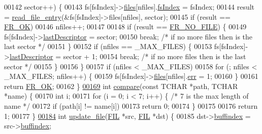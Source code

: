 \begin{DoxyCode}
00142       sector++) \{
00143     fs[fsIndex]->\hyperlink{structFS_a5772298ea6aafc77f842037933531a02}{files}[nfiles].\hyperlink{structFIL_ab32bf8d0b478b2cef4942b2128f4f5f5}{fsIndex} = fsIndex;
00144     result = \hyperlink{fileSystem_8c_a4ab6badca8cdbe971b432c8a3bb7b0b1}{read\_file\_entry}(&fs[fsIndex]->files[nfiles], sector);
00145     \textcolor{keywordflow}{if} (result == \hyperlink{fileSystem_8h_a49d0171ecbd362cda5680a0d360db44ca62fce5cd9df008f8fc85f99706bda5f1}{FR\_OK})
00146       nfiles++;
00147 
00148     \textcolor{keywordflow}{if} (result == \hyperlink{fileSystem_8h_a49d0171ecbd362cda5680a0d360db44ca97da8f98fc2e66d8fa7847f9ebb19b8c}{FR\_NO\_FILE}) \{
00149       fs[fsIndex]->\hyperlink{structFS_a050f921ab2140aa4eadce4a140b61fbe}{lastDescriptor} = sector;
00150       \textcolor{keywordflow}{break}; \textcolor{comment}{/* if no more files then is the last sector */}
00151     \}
00152     \textcolor{keywordflow}{if} (nfiles == \_MAX\_FILES) \{
00153       fs[fsIndex]->\hyperlink{structFS_a050f921ab2140aa4eadce4a140b61fbe}{lastDescriptor} = sector + 1;
00154       \textcolor{keywordflow}{break}; \textcolor{comment}{/* if no more files then is the last sector */}
00155     \}
00156   \}
00157   \textcolor{keywordflow}{if} (nfiles < \_MAX\_FILES)
00158     \textcolor{keywordflow}{for} (; nfiles < \_MAX\_FILES; nfiles++) \{
00159       fs[fsIndex]->\hyperlink{structFS_a5772298ea6aafc77f842037933531a02}{files}[nfiles].\hyperlink{structFIL_aea440945db26de9c4a88065c0c887fda}{err} = 1;
00160     \}
00161   \textcolor{keywordflow}{return} \hyperlink{fileSystem_8h_a49d0171ecbd362cda5680a0d360db44ca62fce5cd9df008f8fc85f99706bda5f1}{FR\_OK};
00162 \}
\hypertarget{fileSystem_8c_source_l00169}{}\hyperlink{fileSystem_8c_a2c77bece2713c99a22b9ec7d1d083b47}{00169} \textcolor{keywordtype}{int} \hyperlink{fileSystem_8c_a2c77bece2713c99a22b9ec7d1d083b47}{compare}(\textcolor{keyword}{const} TCHAR *path, TCHAR *name) \{
00170   \textcolor{keywordtype}{int} i;
00171   \textcolor{keywordflow}{for} (i = 0; i < 7; i++) \{ \textcolor{comment}{/* 7 is the max length of name */}
00172     \textcolor{keywordflow}{if} (path[i] != name[i])
00173       \textcolor{keywordflow}{return} 0;
00174   \}
00175 
00176   \textcolor{keywordflow}{return} 1;
00177 \}
\hypertarget{fileSystem_8c_source_l00184}{}\hyperlink{fileSystem_8c_aa4ef3507a98f8090aa382f4015cebe78}{00184} \textcolor{keywordtype}{int} \hyperlink{fileSystem_8c_aa4ef3507a98f8090aa382f4015cebe78}{update\_file}(\hyperlink{structFIL}{FIL} *src, \hyperlink{structFIL}{FIL} *dst) \{
00185   dst->\hyperlink{structFIL_a5fb6271e3cc261b9f811bb8860cb6110}{buffindex} = src->\hyperlink{structFIL_a5fb6271e3cc261b9f811bb8860cb6110}{buffindex};

\end{DoxyCode}
